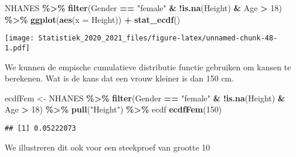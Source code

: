 \documentclass[
  12pt,dutch,coursenotes]{book}
\newenvironment{Shaded}{\begin{snugshade}}{\end{snugshade}}
\newcommand{\DataTypeTok}[1]{\textcolor[rgb]{0.13,0.29,0.53}{#1}}
\newcommand{\DecValTok}[1]{\textcolor[rgb]{0.00,0.00,0.81}{#1}}
\newcommand{\KeywordTok}[1]{\textcolor[rgb]{0.13,0.29,0.53}{\textbf{#1}}}
\newcommand{\NormalTok}[1]{#1}
\newcommand{\OperatorTok}[1]{\textcolor[rgb]{0.81,0.36,0.00}{\textbf{#1}}}
\newcommand{\StringTok}[1]{\textcolor[rgb]{0.31,0.60,0.02}{#1}}
\theoremstyle{definition}
\theoremstyle{definition}
\theoremstyle{definition}
\theoremstyle{remark}
\begin{document}
\begin{Shaded}
\begin{Highlighting}[]
\NormalTok{NHANES }\OperatorTok{\%\textgreater{}\%}\StringTok{ }\KeywordTok{filter}\NormalTok{(Gender }\OperatorTok{==}\StringTok{ "female"} \OperatorTok{\&}\StringTok{ }\OperatorTok{!}\KeywordTok{is.na}\NormalTok{(Height) }\OperatorTok{\&}\StringTok{ }
\StringTok{    }\NormalTok{Age }\OperatorTok{\textgreater{}}\StringTok{ }\DecValTok{18}\NormalTok{) }\OperatorTok{\%\textgreater{}\%}\StringTok{ }\KeywordTok{ggplot}\NormalTok{(}\KeywordTok{aes}\NormalTok{(}\DataTypeTok{x =}\NormalTok{ Height)) }\OperatorTok{+}\StringTok{ }\KeywordTok{stat\_ecdf}\NormalTok{()}
\end{Highlighting}
\end{Shaded}

\texttt{[image: Statistiek\_2020\_2021\_files/figure-latex/unnamed-chunk-48-1.pdf]}

We kunnen de empische cumulatieve distributie functie gebruiken om kansen te berekenen.
Wat is de kans dat een vrouw kleiner is dan 150 cm.

\begin{Shaded}
\begin{Highlighting}[]
\NormalTok{ecdfFem \textless{}{-}}\StringTok{ }\NormalTok{NHANES }\OperatorTok{\%\textgreater{}\%}\StringTok{ }\KeywordTok{filter}\NormalTok{(Gender }\OperatorTok{==}\StringTok{ "female"} \OperatorTok{\&}\StringTok{ }\OperatorTok{!}\KeywordTok{is.na}\NormalTok{(Height) }\OperatorTok{\&}\StringTok{ }
\StringTok{    }\NormalTok{Age }\OperatorTok{\textgreater{}}\StringTok{ }\DecValTok{18}\NormalTok{) }\OperatorTok{\%\textgreater{}\%}\StringTok{ }\KeywordTok{pull}\NormalTok{(}\StringTok{"Height"}\NormalTok{) }\OperatorTok{\%\textgreater{}\%}\StringTok{ }\NormalTok{ecdf}
\KeywordTok{ecdfFem}\NormalTok{(}\DecValTok{150}\NormalTok{)}
\end{Highlighting}
\end{Shaded}

\begin{verbatim}
## [1] 0.05222073
\end{verbatim}

We illustreren dit ook voor een steekproef van grootte 10
\end{document}
